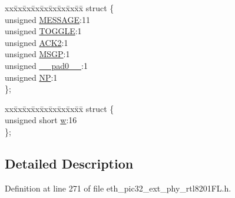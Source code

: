 \begin{DoxyCompactItemize}
\begin{tabbing}
\end{tabbing}\item 
\begin{tabbing}
xx\=xx\=xx\=xx\=xx\=xx\=xx\=xx\=xx\=\kill
struct \{\\
\>unsigned \hyperlink{union_____a_n_n_p_t_rbits__t_a06361005f0d2faefe34e0bdb1499bfe7}{MESSAGE}:11\\
\>unsigned \hyperlink{union_____a_n_n_p_t_rbits__t_ab4110904eded0b4b6a2280a6b4b9f4c2}{TOGGLE}:1\\
\>unsigned \hyperlink{union_____a_n_n_p_t_rbits__t_a04eefaff71d440a3996c7db3676475ba}{ACK2}:1\\
\>unsigned \hyperlink{union_____a_n_n_p_t_rbits__t_a8c958300dd9e82d064f59696a78d8e45}{MSGP}:1\\
\>unsigned \hyperlink{union_____a_n_n_p_t_rbits__t_adf71f3d8410c1f1dbbc96680a92c49af}{\_\_pad0\_\_}:1\\
\>unsigned \hyperlink{union_____a_n_n_p_t_rbits__t_ac89729be1dc289730931f8238a316516}{NP}:1\\
\}; \\

\end{tabbing}\item 
\begin{tabbing}
xx\=xx\=xx\=xx\=xx\=xx\=xx\=xx\=xx\=\kill
struct \{\\
\>unsigned short \hyperlink{union_____a_n_n_p_t_rbits__t_a160850a4684a3e82c2323033964f2e98}{w}:16\\
\}; \\

\end{tabbing}\end{DoxyCompactItemize}


\subsection{Detailed Description}


Definition at line 271 of file eth\+\_\+pic32\+\_\+ext\+\_\+phy\+\_\+rtl8201\+F\+L.\+h.



